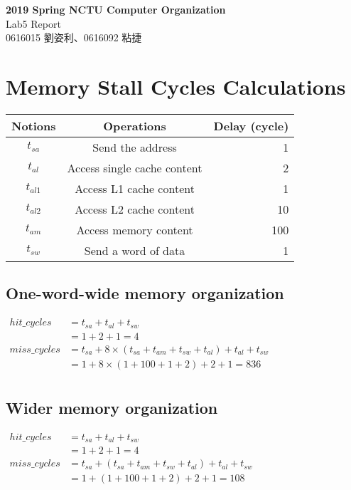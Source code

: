 \documentclass[12pt, a4paper]{article}
\title{
    \textbf{2019 Spring NCTU Computer Organization} \\
    \large Lab5 Report \\
    \small Tracy Liu
    \author Tracy Liu
    \date{}
}
\begin{document}
    \begin{CJK*}{UTF8}{bsmi}
    \begin{center}
        \LARGE\textbf{2019 Spring NCTU Computer Organization} \\
        \large Lab5 Report \\
        \small 0616015 劉姿利、0616092 粘捷 \\
    \end{center}
    \section{Memory Stall Cycles Calculations}
        \begin{center}
            \begin{tabular}{ccr}
            \hline
                Notions & Operations & Delay (cycle) \\
            \hline
                $t_{sa}$ & Send the address & 1 \\
                $t_{al}$ & Access single cache content & 2 \\
                $t_{al1}$ & Access L1 cache content & 1 \\
                $t_{al2}$ & Access L2 cache content & 10 \\
                $t_{am}$ & Access memory content & 100 \\
                $t_{sw}$ & Send a word of data & 1 \\
            \hline
            \end{tabular}
        \end{center}
        \subsection{One-word-wide memory organization}
            $
            \begin{aligned} 
            hit\_cycles  & = t_{sa} + t_{al} + t_{sw} \\ 
                         & = 1 + 2 + 1 = 4 \\
            miss\_cycles & = t_{sa} + 8 \times (t_{sa} + t_{am} + t_{sw} + t_{al}) + t_{al} + t_{sw} \\
                         & = 1 + 8 \times (1 + 100 + 1 + 2) + 2 + 1 = 836 \\
            \end{aligned}  
            $
        \subsection{Wider memory organization}
            $
            \begin{aligned} 
            hit\_cycles & = t_{sa} + t_{al} + t_{sw} \\ 
                       & = 1 + 2 + 1 = 4 \\
            miss\_cycles & = t_{sa} + (t_{sa} + t_{am} + t_{sw} + t_{al}) + t_{al} + t_{sw} \\
                        & = 1 + (1 + 100 + 1 + 2) + 2 + 1 = 108 \\
            \end{aligned} 
            $

\end{CJK*}
\end{document}
